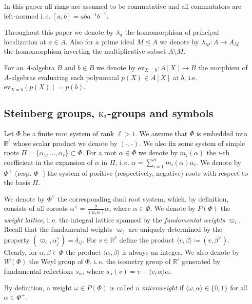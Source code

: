 In this paper all rings are assumed to be commutative and all commutators are left-normed i.\,e. $[a, b] = a b a^{-1} b^{-1}$.

Throughout this paper we denote by $\lambda_a$ the homomorphism of principal localization at $a \in A$.
Also for a prime ideal $M \trianglelefteq A$ we denote by $\lambda_M \colon A \to A_M$ the homomorphism inverting the multiplicative subset $A \setminus M$.

For an $A$-algebra $B$ and $b\in B$ we denote by $\mathrm{ev}_{X=b} \colon A[X]\rightarrow B$ the morphism of $A$-algebras evaluating each polynomial
$p(X)\in A[X]$ at $b$, i.e. $\mathrm{ev}_{X=b}(p(X)) = p(b)$.

\subsection{Steinberg groups, $\operatorname{K}_2$-groups and symbols}\label{subsec:steinberg-preliminaries}
Let $\Phi$ be a finite root system of rank $\ell > 1$.
We assume that $\Phi$ is embedded into $\mathbb{R}^\ell$ whose scalar product we denote by $(\text{-}, \text{-})$.
We also fix some system of simple roots $\Pi = \{\alpha_1, \ldots, \alpha_\ell\} \subset \Phi$.
For a root $\alpha\in\Phi$ we denote by $m_i(\alpha)$ the $i$-th coefficient in the expansion of $\alpha$ in $\Pi$,
i.\,e. $\alpha = \sum_{i=1}^n m_i(\alpha) \alpha_i$.
We denote by $\Phi^+$ (resp. $\Phi^-$) the system of positive (respectively, negative) roots with respect to the basis $\Pi$.

We denote by $\Phi^\vee$ the corresponding dual root system, which, by definition, consists of all coroots $\alpha^\vee = \frac{2}{(\alpha, \alpha)} \alpha$, where $\alpha \in \Phi$.
We denote by $P(\Phi)$ the \textit{weight lattice}, i.\,e. the integral lattice spanned by the \emph{fundamental weights $\varpi_i$}.
Recall that the fundamental weights $\varpi_i$ are uniquely determined by the property $(\varpi_i, \alpha_j^\vee) = \delta_{ij}$.
For $v \in \mathbb{R}^\ell$ define the product $\langle v, \beta \rangle \coloneqq (v, \beta^\vee).$
Clearly, for $\alpha,\beta \in \Phi$ the product $\langle \alpha, \beta\rangle$ is always an integer.
We also denote by $W(\Phi)$ the Weyl group of $\Phi$, i.\,e. the isometry group of $\mathbb{R}^\ell$ generated by fundamental reflections $s_\alpha$,
where $s_\alpha(v) = v - \langle v, \alpha\rangle \alpha$.

By definition, a weight $\omega \in P(\Phi)$ is called a \textit{microweight} if $\langle \omega, \alpha \rangle \in \{ 0, 1 \}$ for all $\alpha \in \Phi^+$.

